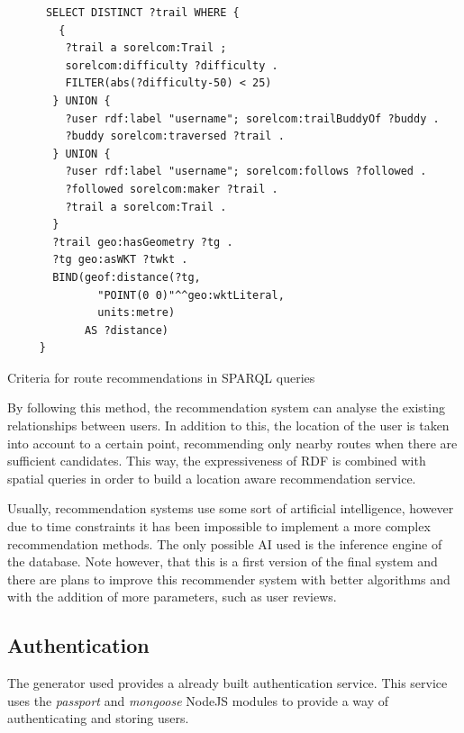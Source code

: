\begin{listing}[ht]\centering
  \begin{minipage}{.8\textwidth}
    \begin{verbatim}
      SELECT DISTINCT ?trail WHERE {
        {
         ?trail a sorelcom:Trail ;
         sorelcom:difficulty ?difficulty .
         FILTER(abs(?difficulty-50) < 25)
       } UNION {
         ?user rdf:label "username"; sorelcom:trailBuddyOf ?buddy .
         ?buddy sorelcom:traversed ?trail .
       } UNION {
         ?user rdf:label "username"; sorelcom:follows ?followed .
         ?followed sorelcom:maker ?trail .
         ?trail a sorelcom:Trail .
       }
       ?trail geo:hasGeometry ?tg .
       ?tg geo:asWKT ?twkt .
       BIND(geof:distance(?tg, 
              "POINT(0 0)"^^geo:wktLiteral, 
              units:metre) 
            AS ?distance)
     }
    \end{verbatim}
  \end{minipage}
  \caption{Criteria for route recommendations in SPARQL queries}\label{lst:recommendation}
\end{listing}

By following this method, the recommendation system can analyse the existing relationships between users. In addition to this, the location of the user is taken into account to a certain point, recommending only nearby routes when there are sufficient candidates. This way, the expressiveness of RDF is combined with spatial queries in order to build a location aware recommendation service.

Usually, recommendation systems use some sort of artificial intelligence, however due to time constraints it has been impossible to implement a more complex recommendation methods. The only possible AI used is the inference engine of the database. Note however, that this is a first version of the final system and there are plans to improve this recommender system with better algorithms and with the addition of more parameters, such as user reviews.

\subsection{Authentication}

The generator used provides a already built authentication service. This service uses the \textit{passport} and \textit{mongoose} NodeJS modules to provide a way of authenticating and storing users.

